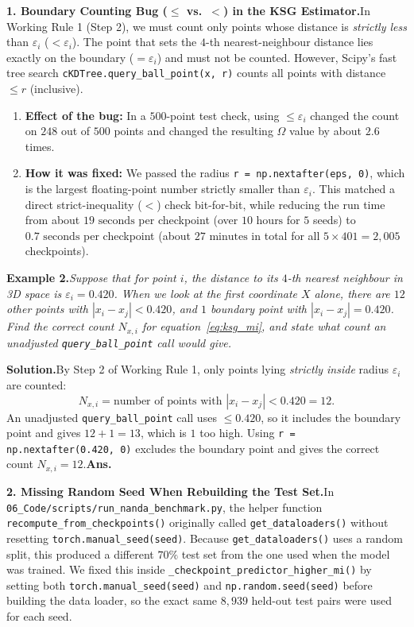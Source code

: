 \documentclass[11pt,a4paper,oneside]{report}
\newcommand{\Ans}{\hfill\textbf{Ans.}}
\begin{document}
\noindent\textbf{1. Boundary Counting Bug ($\le$ vs.\ $<$) in the KSG Estimator.}\quad In Working Rule 1 (Step 2), we must count only points whose distance is \emph{strictly less} than $\varepsilon_i$ ($< \varepsilon_i$). The point that sets the $4$-th nearest-neighbour distance lies exactly on the boundary ($= \varepsilon_i$) and must not be counted. However, Scipy's fast tree search \texttt{cKDTree.query\_ball\_point(x, r)} counts all points with distance $\le r$ (inclusive).
\begin{enumerate}[label=\textbf{(\roman*)}]
\item \textbf{Effect of the bug:} In a $500$-point test check, using $\le \varepsilon_i$ changed the count on $248$ out of $500$ points and changed the resulting $\Omega$ value by about $2.6$ times.
\item \textbf{How it was fixed:} We passed the radius \texttt{r = np.nextafter(eps, 0)}, which is the largest floating-point number strictly smaller than $\varepsilon_i$. This matched a direct strict-inequality ($<$) check bit-for-bit, while reducing the run time from about $19\text{ seconds}$ per checkpoint (over $10\text{ hours}$ for $5$ seeds) to $0.7\text{ seconds}$ per checkpoint (about $27\text{ minutes}$ in total for all $5 \times 401 = 2{,}005$ checkpoints).
\end{enumerate}

\noindent\textbf{Example 2.}\quad \textit{Suppose that for point $i$, the distance to its $4$-th nearest neighbour in 3D space is $\varepsilon_i = 0.420$. When we look at the first coordinate $X$ alone, there are $12$ other points with $|x_i - x_j| < 0.420$, and $1$ boundary point with $|x_i - x_j| = 0.420$. Find the correct count $N_{x,i}$ for equation~\eqref{eq:ksg_mi}, and state what count an unadjusted \texttt{query\_ball\_point} call would give.}

\smallskip
\noindent\textbf{Solution.}\quad By Step 2 of Working Rule 1, only points lying \emph{strictly inside} radius $\varepsilon_i$ are counted:
\[
N_{x,i} = \text{number of points with } |x_i - x_j| < 0.420 = 12.
\]
An unadjusted \texttt{query\_ball\_point} call uses $\le 0.420$, so it includes the boundary point and gives $12 + 1 = 13$, which is $1$ too high. Using \texttt{r = np.nextafter(0.420, 0)} excludes the boundary point and gives the correct count $N_{x,i} = 12$.\Ans

\medskip
\noindent\textbf{2. Missing Random Seed When Rebuilding the Test Set.}\quad In \texttt{06\_Code/scripts/run\_nanda\_benchmark.py}, the helper function \texttt{recompute\_from\_checkpoints()} originally called \texttt{get\_dataloaders()} without resetting \texttt{torch.manual\_seed(seed)}. Because \texttt{get\_dataloaders()} uses a random split, this produced a different $70\%$ test set from the one used when the model was trained. We fixed this inside \texttt{\_checkpoint\_predictor\_higher\_mi()} by setting both \texttt{torch.manual\_seed(seed)} and \texttt{np.random.seed(seed)} before building the data loader, so the exact same $8{,}939$ held-out test pairs were used for each seed.
\end{document}
